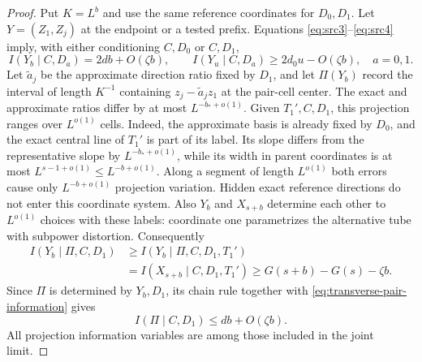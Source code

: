 \begin{proof}
Put $K=L^b$ and use the same reference coordinates for $D_0,D_1$.
Let $Y=(Z_1,Z_j)$ at the endpoint or a tested prefix.  Equations
\eqref{eq:src3}--\eqref{eq:src4} imply, with either conditioning
$C,D_0$ or $C,D_1$,
\begin{equation}\label{eq:transverse-pair-information}
 I(Y_b\mid C,D_a)=2db+O(\zeta b),\qquad
 I(Y_u\mid C,D_a)\ge2d_0u-O(\zeta b),\quad a=0,1.
\end{equation}
Let $\widetilde a_j$ be the approximate direction ratio fixed by
$D_1$, and let $\Pi(Y_b)$ record the interval of length $K^{-1}$
containing $z_j-\widetilde a_jz_1$ at the pair-cell center.
The exact and approximate ratios differ by at most
$L^{-b_*+o(1)}$.  Given $T_1',C,D_1$, this projection ranges over
$L^{o(1)}$ cells.  Indeed, the approximate basis is already fixed
by $D_0$, and the exact central line of $T_1'$ is part of its
label.  Its slope differs from the representative slope by
$L^{-b_*+o(1)}$, while its width in parent coordinates is at most
$L^{s-1+o(1)}\le L^{-b+o(1)}$.  Along a segment of length
$L^{o(1)}$ both errors cause only $L^{-b+o(1)}$ projection
variation.  Hidden exact reference directions do not enter this
coordinate system.  Also $Y_b$ and $X_{s+b}$ determine each other
to $L^{o(1)}$ choices with these labels: coordinate one parametrizes
the alternative tube with subpower distortion.  Consequently
\begin{align*}
 I(Y_b\mid\Pi,C,D_1)
 &\ge I(Y_b\mid\Pi,C,D_1,T_1')\\
 &=I(X_{s+b}\mid C,D_1,T_1')
   \ge G(s+b)-G(s)-\zeta b.
\end{align*}
Since $\Pi$ is determined by $Y_b,D_1$, its chain rule together
with \eqref{eq:transverse-pair-information} gives
\begin{equation}\label{eq:transverse-projection-information}
 I(\Pi\mid C,D_1)\le db+O(\zeta b).
\end{equation}
All projection information variables are among those included in
the joint limit.


\end{proof}

